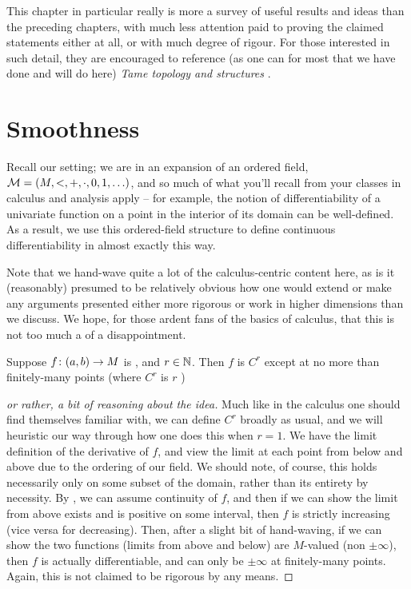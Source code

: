 \medskip

This chapter in particular really is more a survey of useful results and ideas than the preceding chapters, with much less attention paid to proving the claimed statements either at all, or with much degree of rigour. For those interested in such detail, they are encouraged to reference (as one can for most that we have done and will do here) \emph{Tame topology and \Om structures} \cite{dries_tame_1998}.

\section{Smoothness}
Recall our setting; we are in an \om expansion of an ordered field, $\mathcal{M} = (M, <, +, \cdot, 0, 1, \hdots)$, and so much of what you'll recall from your classes in calculus and analysis apply -- for example, the notion of differentiability of a univariate function on a point in the interior of its domain can be well-defined. As a result, we use this ordered-field structure to define continuous differentiability in almost exactly this way.

\begin{svgraybox}
  Note that we hand-wave quite a lot of the calculus-centric content here, as is it (reasonably) presumed to be relatively obvious how one would extend or make any arguments presented either more rigorous or work in higher dimensions than we discuss. We hope, for those ardent fans of the basics of calculus, that this is not too much a of a disappointment.
\end{svgraybox}


\begin{theorem}
  Suppose $f \colon (a, b) \to M$ is , and $r \in \mathbb{N}$. Then $f$ is $C^{r}$ except at no more than finitely-many points (where $C^r$ is $r$ \contdfblty)
  \label{thm:cont_diff}
\end{theorem}

\begin{proof}[or rather, a bit of reasoning about the idea]
Much like in the calculus one should find themselves familiar with, we can define $C^r$ broadly as usual, and we will heuristic our way through how one does this when $r=1$. We have the limit definition of the derivative of $f$, and view the limit at each point from below and above due to the ordering of our field. We should note, of course, this holds necessarily only on some subset of the domain, rather than its entirety by necessity. By \Mt, we can assume continuity of $f$, and then if we can show the limit from above exists and is positive on some interval, then $f$ is strictly increasing (vice versa for decreasing). Then, after a slight bit of hand-waving, if we can show the two functions (limits from above and below) are $M$-valued (non $\pm \infty$), then $f$ is actually differentiable, and can only be $\pm \infty$ at finitely-many points. Again, this is not claimed to be rigorous by any means.
\end{proof}

